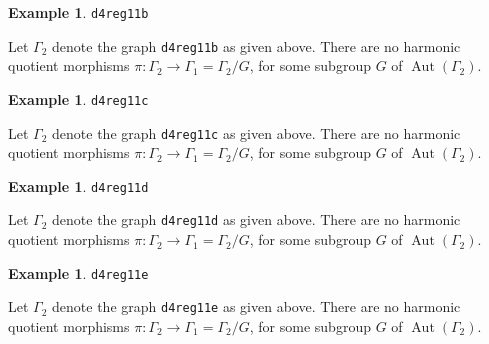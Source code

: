 \documentclass[12pt,letterpaper]{article}
\theoremstyle{definition}
\newtheorem{example}[theorem]{Example}
\DeclareMathOperator{\Aut}{Aut}
\begin{document}
\begin{example}%
\label{example:d4reg11b}
 {\tt d4reg11b}\newline
{\rm  
  Let $\Gamma_2$ denote the graph {\tt d4reg11b} as given above.
There are no harmonic quotient morphisms
$\pi: \Gamma_2\to \Gamma_1=\Gamma_2/G$,
for some subgroup $G$ of $\Aut(\Gamma_2)$.

}
\end{example}



\begin{example}%
\label{example:d4reg11c}
 {\tt d4reg11c}\newline
{\rm  
  Let $\Gamma_2$ denote the graph {\tt d4reg11c} as given above.
There are no harmonic quotient morphisms
$\pi: \Gamma_2\to \Gamma_1=\Gamma_2/G$,
for some subgroup $G$ of $\Aut(\Gamma_2)$.

}
\end{example}


\begin{example}%
\label{example:d4reg11d}
 {\tt d4reg11d}\newline
{\rm  
  Let $\Gamma_2$ denote the graph {\tt d4reg11d} as given above.
There are no harmonic quotient morphisms
$\pi: \Gamma_2\to \Gamma_1=\Gamma_2/G$,
for some subgroup $G$ of $\Aut(\Gamma_2)$.

}
\end{example}


\begin{example}%
\label{example:d4reg11e}
 {\tt d4reg11e}\newline
{\rm  
  Let $\Gamma_2$ denote the graph {\tt d4reg11e} as given above.
There are no harmonic quotient morphisms
$\pi: \Gamma_2\to \Gamma_1=\Gamma_2/G$,
for some subgroup $G$ of $\Aut(\Gamma_2)$.

}
\end{example}
\end{document}
